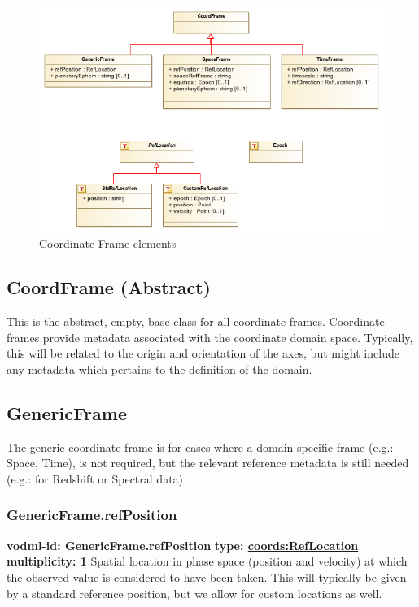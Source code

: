   \begin{figure}[h]
  \begin{center}
    \includegraphics[width=4.5in]{diagrams/CoordFrame.png}
    \caption{Coordinate Frame elements}\label{fig:coordframe}
  \end{center}
  \end{figure}

  \subsection{CoordFrame (Abstract)}
  \label{sect:CoordFrame}
    This is the abstract, empty, base class for all coordinate frames. Coordinate frames provide metadata associated with the coordinate domain space. Typically, this will be related to the origin and orientation of the axes, but might include any metadata which pertains to the definition of the domain.

  \subsection{GenericFrame}
  \label{sect:GenericFrame}
    The generic coordinate frame is for cases where a domain-specific frame (e.g.: Space, Time), is not required, but the relevant reference metadata is still needed (e.g.: for Redshift or Spectral data)

    \subsubsection{GenericFrame.refPosition}
      \textbf{vodml-id: GenericFrame.refPosition} \newline
      \textbf{type: \hyperref[sect:RefLocation]{coords:RefLocation}} \newline
      \textbf{multiplicity: 1} \newline 
      Spatial location in phase space (position and velocity) at which the observed value is considered to have been taken. This will typically be given by a standard reference position, but we allow for custom locations as well.

